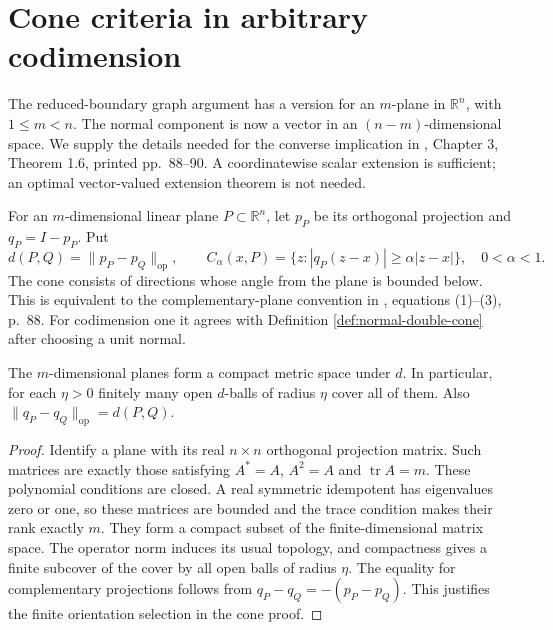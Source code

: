 \chapter{Cone criteria in arbitrary codimension}\label{sec:rectifiable-cone-characterization}
The reduced-boundary graph argument has a version for an $m$-plane in $\mathbb R^n$, with $1\leq m<n$. The normal component is now a vector in an $(n-m)$-dimensional space. We supply the details needed for the converse implication in \cite{Sim18}, Chapter 3, Theorem 1.6, printed pp.~88--90. A coordinatewise scalar extension is sufficient; an optimal vector-valued extension theorem is not needed.

\begin{definition}\label{def:plane-projection-cone}
For an $m$-dimensional linear plane $P\subset\mathbb R^n$, let $p_P$ be its orthogonal projection and $q_P=I-p_P$. Put
\[
 d(P,Q)=\|p_P-p_Q\|_{\mathrm{op}},\qquad
 C_\alpha(x,P)=\{z:|q_P(z-x)|\geq\alpha|z-x|\},\quad0<\alpha<1.
\]
The cone consists of directions whose angle from the plane is bounded below. This is equivalent to the complementary-plane convention in \cite{Sim18}, equations (1)--(3), p.~88. For codimension one it agrees with Definition \ref{def:normal-double-cone} after choosing a unit normal.
\end{definition}

\begin{lemma}\label{lem:grassmann-finite-nets}
The $m$-dimensional planes form a compact metric space under $d$. In particular, for each $\eta>0$ finitely many open $d$-balls of radius $\eta$ cover all of them. Also $\|q_P-q_Q\|_{\mathrm{op}}=d(P,Q)$.
\end{lemma}
\begin{proof}
Identify a plane with its real $n\times n$ orthogonal projection matrix. Such matrices are exactly those satisfying $A^*=A$, $A^2=A$ and $\operatorname{tr}A=m$. These polynomial conditions are closed. A real symmetric idempotent has eigenvalues zero or one, so these matrices are bounded and the trace condition makes their rank exactly $m$. They form a compact subset of the finite-dimensional matrix space. The operator norm induces its usual topology, and compactness gives a finite subcover of the cover by all open balls of radius $\eta$. The equality for complementary projections follows from $q_P-q_Q=-(p_P-p_Q)$. This justifies the finite orientation selection in the cone proof.
\end{proof}

